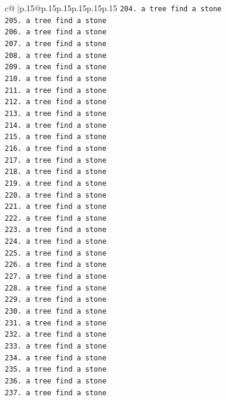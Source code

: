 \documentclass{article}
\begin{document}
{\begin{supertabular}{c@{$\;$}|p{.15\linewidth}@{}p{.15\linewidth}p{.15\linewidth}p{.15\linewidth}p{.15\linewidth}p{.15\linewidth}}
{{{\texttt{204. a tree find a stone} \\
\texttt{205. a tree find a stone} \\
\texttt{206. a tree find a stone} \\
\texttt{207. a tree find a stone} \\
\texttt{208. a tree find a stone} \\
\texttt{209. a tree find a stone} \\
\texttt{210. a tree find a stone} \\
\texttt{211. a tree find a stone} \\
\texttt{212. a tree find a stone} \\
\texttt{213. a tree find a stone} \\
\texttt{214. a tree find a stone} \\
\texttt{215. a tree find a stone} \\
\texttt{216. a tree find a stone} \\
\texttt{217. a tree find a stone} \\
\texttt{218. a tree find a stone} \\
\texttt{219. a tree find a stone} \\
\texttt{220. a tree find a stone} \\
\texttt{221. a tree find a stone} \\
\texttt{222. a tree find a stone} \\
\texttt{223. a tree find a stone} \\
\texttt{224. a tree find a stone} \\
\texttt{225. a tree find a stone} \\
\texttt{226. a tree find a stone} \\
\texttt{227. a tree find a stone} \\
\texttt{228. a tree find a stone} \\
\texttt{229. a tree find a stone} \\
\texttt{230. a tree find a stone} \\
\texttt{231. a tree find a stone} \\
\texttt{232. a tree find a stone} \\
\texttt{233. a tree find a stone} \\
\texttt{234. a tree find a stone} \\
\texttt{235. a tree find a stone} \\
\texttt{236. a tree find a stone} \\
\texttt{237. a tree find a stone} \\
}}}
\end{supertabular}}
\end{document}

